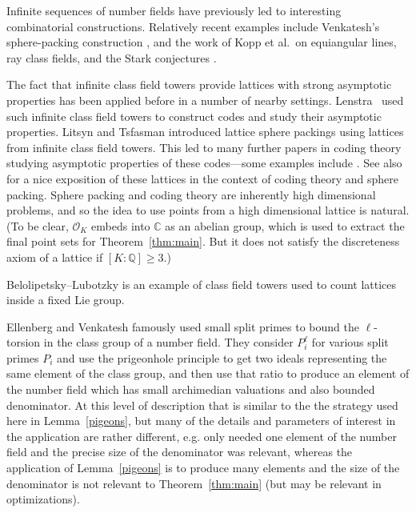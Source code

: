 \documentclass[11pt,reqno]{amsart}
\numberwithin{equation}{section}
\theoremstyle{definition}
\theoremstyle{remark}
\newcommand{\C}{\mathbb{C}}
\newcommand{\Q}{\mathbb{Q}}
\renewcommand{\O}{\mathcal{O}}
\begin{document}
Infinite sequences of number fields have previously led to interesting combinatorial constructions.
Relatively recent examples include Venkatesh's sphere-packing construction \cite{Venkatesh2013SpherePackings}, and the work of Kopp et al.~on
equiangular lines, ray class fields, and the Stark conjectures \cite{Kopp2021SICPOVMStark,ApplebyFlammiaMcConnellYard2020RayClassFields}.

The fact that infinite class field towers provide lattices with strong asymptotic properties has been applied before in a number of nearby settings.  
Lenstra~\cite{Lenstra1986Codes} used such infinite class field towers to construct codes and study their asymptotic properties.
Litsyn and Tsfasman \cite[Section 7]{LitsynTsfasman1987Constructive} introduced lattice sphere packings using lattices from infinite class field towers.  This led to many further papers in coding theory studying asymptotic properties of these codes---some examples include \cite{VehkalahtiLuzzi2015NumberField,Maire2018,LuzziVehkalahtiLing2018AlmostUniversal,Guruswami2003Constructions, Liang2024QaryGV}.  See also \cite{Tsfasman1991GlobalFields} for a nice exposition of these lattices in the context of coding theory and sphere packing.
Sphere packing and coding theory are inherently high dimensional problems, and so the idea to use points from a high dimensional lattice is natural.
(To be clear, $\O_K$ embeds into $\C$ as an abelian group,
which is used to extract the final point sets for Theorem~\ref{thm:main}.
But it does not satisfy the discreteness axiom of a lattice if $[K:\Q] \ge 3$.)

Belolipetsky--Lubotzky
\cite{belolipetsky2012manifolds}
is an example of class field towers used to count lattices inside a fixed Lie group.

Ellenberg and Venkatesh \cite[Lemma 2.3]{EllenbergVenkatesh2007Reflection} famously used small split primes to bound the $\ell$-torsion in the class group of a number field.  They consider  $P_i^\ell$ for various split primes $P_i$ and use the prigeonhole principle to get two ideals representing the same element of the class group, and then use that ratio to produce an element of the number field which has small archimedian valuations and also bounded denominator.   At this level of description that is similar to the the strategy used here in Lemma~\ref{pigeons}, but many of the details and parameters of interest in the application are rather different, e.g. \cite{EllenbergVenkatesh2007Reflection} only needed one element of the number field and the precise size of the denominator was relevant, whereas the application of Lemma~\ref{pigeons} is to produce many elements and the size of the denominator is not relevant to Theorem~\ref{thm:main} (but may be relevant in optimizations).
\end{document}
